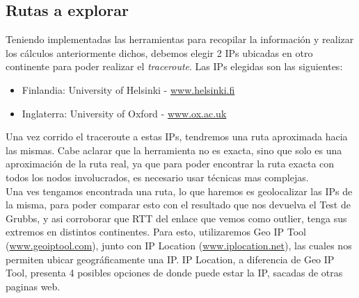 \subsection{Rutas a explorar}

Teniendo implementadas las herramientas para recopilar la información y realizar los cálculos anteriormente dichos, debemos elegir 2 IPs ubicadas en otro continente para poder realizar el \textit{traceroute}. Las IPs elegidas son las siguientes:

\begin{itemize}
	\item Finlandia: University of Helsinki - \url{www.helsinki.fi}
	\item Inglaterra: University of Oxford - \url{www.ox.ac.uk}
\end{itemize}

Una vez corrido el traceroute a estas IPs, tendremos una ruta aproximada hacia las mismas. Cabe aclarar que la herramienta no es exacta, sino que solo es una aproximación de la ruta real, ya que para poder encontrar la ruta exacta con todos los nodos involucrados, es necesario usar técnicas mas complejas.\\

Una ves tengamos encontrada una ruta, lo que haremos es geolocalizar las IPs de la misma, para poder comparar esto con el resultado que nos devuelva el Test de Grubbs, y asi corroborar que RTT del enlace que vemos como outlier, tenga sus extremos en distintos continentes. Para esto, utilizaremos Geo IP Tool (\url{www.geoiptool.com}), junto con IP Location (\url{www.iplocation.net}), las cuales nos permiten ubicar geográficamente una IP. IP Location, a diferencia de Geo IP Tool, presenta 4 posibles opciones de donde puede estar la IP, sacadas de otras paginas web.










